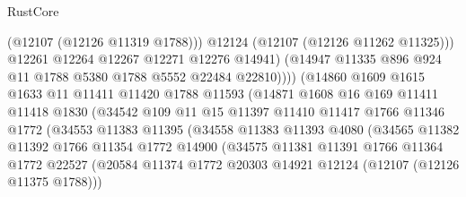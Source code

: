 \begin{lexlean}{RustCore}
\begin{coremodule}
                                    (@12107 (@12126 @11319 @1788)))
                                  @12124
                                  (@12107 (@12126 @11262 @11325)))
                                @12261
                                @12264
                                @12267
                                @12271
                                @12276
                                @14941)
                              (@14947 @11335 @896 @924 @11 @1788 @5380 @1788 @5552 @22484 @22810))))
                        (@14860
                          @1609
                          @1615
                          @1633
                          @11
                          @11411
                          @11420
                          @1788
                          @11593
                          (@14871
                            @1608
                            @16
                            @169
                            @11411
                            @11418
                            @1830
                            (@34542
                              @109
                              @11
                              @15
                              @11397
                              @11410
                              @11417
                              @1766
                              @11346
                              @1772
                              (@34553
                                @11383
                                @11395
                                (@34558
                                  @11383
                                  @11393
                                  @4080
                                  (@34565
                                    @11382
                                    @11392
                                    @1766
                                    @11354
                                    @1772
                                    @14900
                                    (@34575
                                      @11381
                                      @11391
                                      @1766
                                      @11364
                                      @1772
                                      @22527
                                      (@20584
                                        @11374
                                        @1772
                                        @20303
                                        @14921
                                        @12124
                                        (@12107 (@12126 @11375 @1788)))

\end{coremodule}
\end{lexlean}
